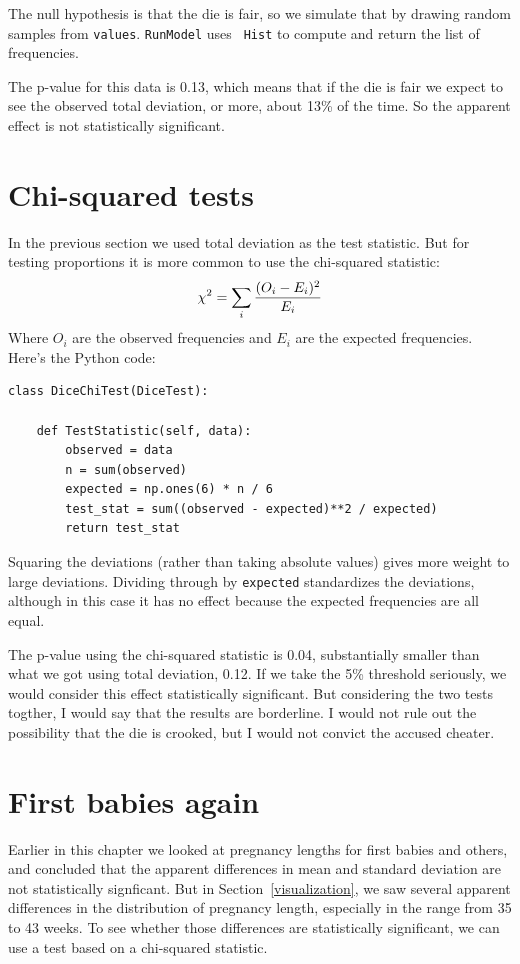 \documentclass[12pt]{book}
\begin{document}
The null hypothesis is that the die is fair, so we simulate that by
drawing random samples from {\tt values}.  {\tt RunModel} uses {\tt
  Hist} to compute and return the list of frequencies.

The p-value for this data is 0.13, which means that if the die is
fair we expect to see the observed total deviation, or more, about
13\% of the time.  So the apparent effect is not statistically
significant.


\section{Chi-squared tests}

In the previous section we used total deviation as the test statistic.
But for testing proportions it is more common to use the chi-squared
statistic:
%
\[ \chi^2 = \sum_i \frac{(O_i - E_i)^2}{E_i} \]
%
% 
Where $O_i$ are the observed frequencies and $E_i$ are the expected
frequencies.  Here's the Python code:

\begin{verbatim}
class DiceChiTest(DiceTest):

    def TestStatistic(self, data):
        observed = data
        n = sum(observed)
        expected = np.ones(6) * n / 6
        test_stat = sum((observed - expected)**2 / expected)
        return test_stat
\end{verbatim}

Squaring the deviations (rather than taking absolute values) gives
more weight to large deviations.  Dividing through by {\tt expected}
standardizes the deviations, although in this case it has no effect
because the expected frequencies are all equal.

The p-value using the chi-squared statistic is 0.04,
substantially smaller than what we got using total deviation, 0.12.
If we take the 5\% threshold seriously, we would consider this effect
statistically significant.  But considering the two tests togther, I
would say that the results are borderline.  I would not rule out the
possibility that the die is crooked, but I would not convict the
accused cheater.

\section{First babies again}

Earlier in this chapter we looked at pregnancy lengths for first
babies and others, and concluded that the apparent differences in
mean and standard deviation are not statistically signficant.  But in
Section~\ref{visualization}, we saw several apparent differences
in the distribution of pregnancy length, especially in the range from
35 to 43 weeks.  To see whether those differences are statistically
significant, we can use a test based on a chi-squared statistic.
\end{document}
